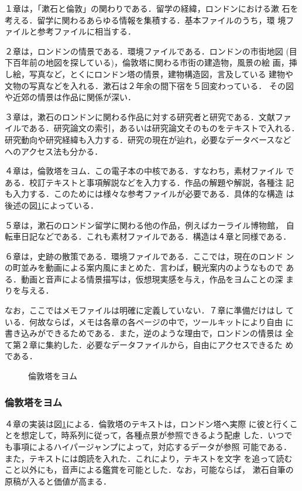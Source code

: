 １章は，「漱石と倫敦」の関わりである．留学の経緯，ロンドンにおける漱
石を考える．留学に関わるあらゆる情報を集積する．基本ファイルのうち，環
境ファイルと参考ファイルに相当する．

２章は，ロンドンの情景である．環境ファイルである．ロンドンの市街地図
(目下百年前の地図を探している)，倫敦塔に関わる市街の建造物，風景の絵
画，挿し絵，写真など，とくにロンドン塔の情景，建物構造図，言及している
建物や文物の写真などを入れる．漱石は２年余の間下宿を５回変わっている．
その図や近郊の情景は作品に関係が深い．

３章は，漱石のロンドンに関わる作品に対する研究者と研究である．文献ファ
イルである．研究論文の索引，あるいは研究論文そのものをテキストで入れる．
研究動向や研究経緯も入力する．研究の現在が辿れ，必要なデータベースなど
へのアクセス法も分かる．

４章は，倫敦塔をヨム．この電子本の中核である．すなわち，素材ファイル
である．校訂テキストと事項解説などを入力する．作品の解題や解説，各種注
記も入力する．このためには様々な参考ファイルが必要である．具体的な構造
は後述の図\ref{fig:8}によっている．

５章は，漱石のロンドン留学に関わる他の作品，例えばカーライル博物館，
自転車日記などである．これも素材ファイルである．構造は４章と同様である．

６章は，史跡の散策である．環境ファイルである．ここでは，現在のロンド
ンの町並みを動画による案内風にまとめた．言わば，観光案内のようなもので
ある．動画と音声による情景描写は，仮想現実感を与え，作品をヨムことの深
まりを与える．

なお，ここではメモファイルは明確に定義していない．７章に準備だけはし
ている．何故ならば，メモは各章の各ページの中で，ツールキットにより自由
に書き込みができるためである．また，逆のような理由で，ロンドンの情景は
全て第２章に集約した．必要なデータファイルから，自由にアクセスできるた
めである．

\begin{figure}[htb]
\begin{center}
  
  \caption{倫敦塔をヨム}\label{fig:8}
\end{center}
\end{figure}

\subsubsection{倫敦塔をヨム}
４章の実装は図\ref{fig:8}による．倫敦塔のテキストは，ロンドン塔へ実際
に彼と行くことを想定して，時系列に従って，各種点景が参照できるよう配慮
した．いつでも事項によるハイパージャンプによって，対応するデータが参照
可能である．また，テキストには朗読を入れた．これにより，テキストを文字
を追って読むこと以外にも，音声による鑑賞を可能とした．なお，可能ならば，
漱石自筆の原稿が入ると価値が高まる．

